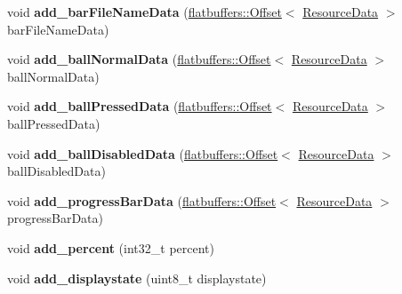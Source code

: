 \begin{DoxyCompactItemize}
void {\bfseries add\+\_\+bar\+File\+Name\+Data} (\hyperlink{structflatbuffers_1_1Offset}{flatbuffers\+::\+Offset}$<$ \hyperlink{structflatbuffers_1_1ResourceData}{Resource\+Data} $>$ bar\+File\+Name\+Data)
\item 
\mbox{\label{structflatbuffers_1_1SliderOptionsBuilder_a9fd6a03716d40438d1184e5ba3fe62ea}} 
void {\bfseries add\+\_\+ball\+Normal\+Data} (\hyperlink{structflatbuffers_1_1Offset}{flatbuffers\+::\+Offset}$<$ \hyperlink{structflatbuffers_1_1ResourceData}{Resource\+Data} $>$ ball\+Normal\+Data)
\item 
\mbox{\label{structflatbuffers_1_1SliderOptionsBuilder_aa6d13491d9db35d2c337a6637cc76ab3}} 
void {\bfseries add\+\_\+ball\+Pressed\+Data} (\hyperlink{structflatbuffers_1_1Offset}{flatbuffers\+::\+Offset}$<$ \hyperlink{structflatbuffers_1_1ResourceData}{Resource\+Data} $>$ ball\+Pressed\+Data)
\item 
\mbox{\label{structflatbuffers_1_1SliderOptionsBuilder_a1cc268a9d49e3cf2967ff332a49065b6}} 
void {\bfseries add\+\_\+ball\+Disabled\+Data} (\hyperlink{structflatbuffers_1_1Offset}{flatbuffers\+::\+Offset}$<$ \hyperlink{structflatbuffers_1_1ResourceData}{Resource\+Data} $>$ ball\+Disabled\+Data)
\item 
\mbox{\label{structflatbuffers_1_1SliderOptionsBuilder_a78fba9fc0a9da2f8c44310f3a9c22cd3}} 
void {\bfseries add\+\_\+progress\+Bar\+Data} (\hyperlink{structflatbuffers_1_1Offset}{flatbuffers\+::\+Offset}$<$ \hyperlink{structflatbuffers_1_1ResourceData}{Resource\+Data} $>$ progress\+Bar\+Data)
\item 
\mbox{\label{structflatbuffers_1_1SliderOptionsBuilder_aba5d2d8af301d477159d89e156968727}} 
void {\bfseries add\+\_\+percent} (int32\+\_\+t percent)
\item 
\mbox{\label{structflatbuffers_1_1SliderOptionsBuilder_a6411b9be9516259374ca4e348d50f51f}} 
void {\bfseries add\+\_\+displaystate} (uint8\+\_\+t displaystate)
\item 
\mbox{\label{structflatbuffers_1_1SliderOptionsBuilder_ae18e8a0747204bde39bbce55ce6f934e}} 

\end{DoxyCompactItemize}
